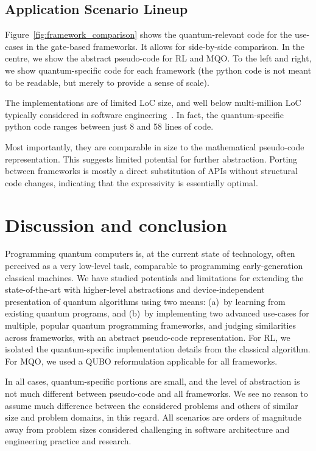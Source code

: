 \documentclass[conference]{IEEEtran}
\begin{document}
\subsection{Application Scenario Lineup}
\label{sec:lineup}


Figure~\ref{fig:framework_comparison} shows the quantum-relevant code for the 
use-cases in the gate-based frameworks. It allows for side-by-side comparison.
In the centre, we show the abstract pseudo-code for RL and MQO.
To the left and right, we show quantum-specific code for each framework
(the python code is not meant to be readable, but merely to provide a sense of scale).

The implementations are of limited LoC size,
and well below multi-million LoC typically considered in software engineering~\cite{Bass:2012}.
In fact, the quantum-specific python code ranges between just 8 and 58 lines of code.


Most importantly, they are comparable in size to the mathematical pseudo-code
representation. This suggests limited potential for further abstraction. Porting between
frameworks is mostly a direct substitution of APIs without
structural code changes, indicating that the expressivity is essentially optimal.


\section{Discussion and conclusion}
\label{conclusion}
Programming quantum computers is, at the current state of technology, often perceived as a very low-level
task, comparable to programming early-generation classical machines. We have studied potentials and limitations
for extending the state-of-the-art with higher-level abstractions and device-independent presentation
of quantum algorithms using two means: (a)~by learning from existing quantum programs, and (b)~by implementing
two advanced use-cases for multiple, popular quantum programming frameworks, and judging similarities
across frameworks, with an abstract pseudo-code representation.
For RL, we isolated the quantum-specific implementation details from the classical algorithm. 
For MQO, we used a QUBO reformulation applicable for all frameworks.

In all cases, quantum-specific portions are small, and the level of abstraction is not much different
between pseudo-code and all frameworks. We see no reason to assume much difference between the considered problems and others of similar size and problem domains, in this regard. All scenarios are orders of magnitude away from problem sizes 
considered challenging in software architecture and engineering practice and research.
\end{document}
